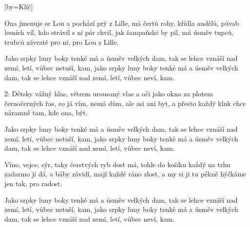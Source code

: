 [by={Klíč}]

\beginverse{}
Ona jmenuje se Lou a pochází prý z Lille,
má čertů rohy, křídla andělů, půvab lesních víl,
kdo strávil s ní pár chvil, jak šampaňské by pil,
má úsměv tupců, trubců závratě pro ni, pro Lou z Lille.
\endverse{}

\beginchorus{}
Jako srpky luny boky tenké má a úsměv velkých dam,
tak se lehce vznáší nad zemí, letí, vůbec netuší, kam,
jako srpky luny boky tenké má a úsměv velkých dam,
tak se lehce vznáší nad zemí, letí, vůbec neví, kam.
\endchorus{}

\beginverse{}
2: Dětsky vážný hlas, větrem urousaný vlas
a oči jako okna za plotem černočerných řas,
co já vím, nemá dům, ale asi ani byt,
a přesto každý kluk chce náramně tam, kde ona, být.
\endverse{}

\beginchorus{}
Jako srpky luny boky tenké má a úsměv velkých dam,
tak se lehce vznáší nad zemí, letí, vůbec netuší, kam,
jako srpky luny boky tenké má a úsměv velkých dam,
tak se lehce vznáší nad zemí, letí, vůbec neví, kam.
\endchorus{}

\beginverse{}
Víno, vejce, sýr, taky čerstvých ryb dost má,
tohle do košíku každý na trhu zadarmo jí dá,
a báby závidí, mají každé ráno zlost,
a my si ji tu pěkně hýčkáme jen tak, pro radost.
\endverse{}

\beginchorus{}
Jako srpky luny boky tenké má a úsměv velkých dam,
tak se lehce vznáší nad zemí, letí, vůbec netuší, kam,
jako srpky luny boky tenké má a úsměv velkých dam,
tak se lehce vznáší nad zemí, letí, vůbec neví, kam.
\endchorus{}

